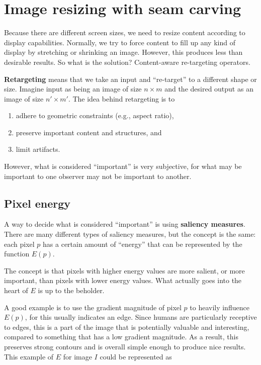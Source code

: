 \documentclass{article}
\begin{document}
\section{Image resizing with seam carving}
Because there are different screen sizes, we need to resize content according to display capabilities. Normally, we try to force content to fill up any kind of display by stretching or shrinking an image. However, this produces less than desirable results. So what is the solution? Content-aware re-targeting operators.

\textbf{Retargeting} means that we take an input and ``re-target'' to a different shape or size. Imagine input as being an image of size $n \times m$ and the desired output as an image of size $n' \times m'$. The idea behind retargeting is to
\begin{enumerate}
	\item adhere to geometric constraints (e.g., aspect ratio),
	\item preserve important content and structures, and
	\item limit artifacts.
\end{enumerate}
However, what is considered ``important'' is very subjective, for what may be important to one observer may not be important to another.

\subsection{Pixel energy}

A way to decide what is considered ``important'' is using \textbf{saliency measures}. There are many different types of saliency measures, but the concept is the same: each pixel $p$ has a certain amount of ``energy'' that can be represented by the function $E(p)$.

The concept is that pixels with higher energy values are more salient, or more important, than pixels with lower energy values. What actually goes into the heart of $E$ is up to the beholder.

A good example is to use the gradient magnitude of pixel $p$ to heavily influence $E(p)$, for this usually indicates an edge. Since humans are particularly receptive to edges, this is a part of the image that is potentially valuable and interesting, compared to something that has a low gradient magnitude. As a result, this preserves strong contours and is overall simple enough to produce nice results. This example of $E$ for image $I$ could be represented as
\end{document}
